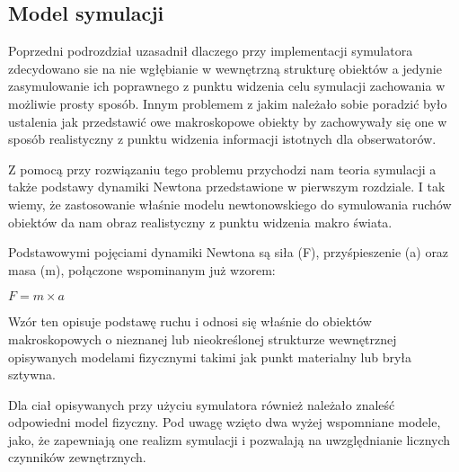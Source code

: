 \subsection{Model symulacji}
\par{
Poprzedni podrozdział uzasadnił dlaczego przy implementacji symulatora zdecydowano sie na nie wgłębianie w wewnętrzną strukturę obiektów a jedynie zasymulowanie ich poprawnego z punktu widzenia celu symulacji zachowania w możliwie prosty sposób. Innym problemem z jakim należało sobie poradzić było ustalenia jak przedstawić owe makroskopowe obiekty by zachowywały się one w sposób realistyczny z punktu widzenia informacji istotnych dla obserwatorów.
}
\par{
Z pomocą przy rozwiązaniu tego problemu przychodzi nam teoria symulacji a także podstawy dynamiki Newtona przedstawione w pierwszym rozdziale.
I tak wiemy, że zastosowanie właśnie modelu newtonowskiego do symulowania ruchów obiektów da nam obraz realistyczny z punktu widzenia makro świata.
}
\par{
Podstawowymi pojęciami dynamiki Newtona są siła (F), przyśpieszenie (a) oraz masa (m), połączone wspominanym już wzorem:
\begin{center}
$F = m \times a$
\end{center}
Wzór ten opisuje podstawę ruchu i odnosi się właśnie do obiektów makroskopowych o nieznanej lub nieokreślonej strukturze wewnętrznej opisywanych modelami fizycznymi takimi jak punkt materialny lub bryła sztywna.
}
\par{
Dla ciał opisywanych przy użyciu symulatora również należało znaleść odpowiedni model fizyczny. Pod uwagę wzięto dwa wyżej wspomniane modele, jako, że zapewniają one realizm symulacji i pozwalają na uwzględnianie licznych czynników zewnętrznych.
}
